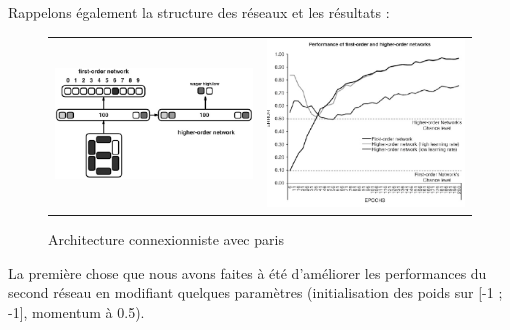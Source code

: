 \documentclass[a4paper,12pt, twoside]{article}
\begin{document}
Rappelons également la structure des réseaux et les résultats :
\begin{figure}[H]
\begin{center}
\begin{tabular}{cc}
 \includegraphics[width=220px]{../cleeremans_2007/digital_reco/schema.png} &
 \includegraphics[width=220px]{../cleeremans_2007/digital_reco/perf_article.png}
\end{tabular}
\end{center}
 \caption{ \cite{Cleeremans_2007}  Architecture connexionniste avec paris  }
\end{figure}


La première chose que nous avons faites à été d'améliorer les performances du second réseau
en modifiant quelques paramètres (initialisation des poids sur [-1 ; -1], momentum à 0.5). 
\end{document}
